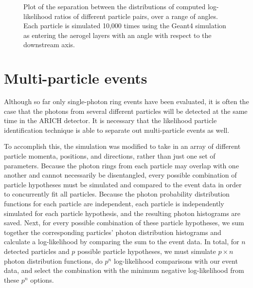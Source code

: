 \begin{figure}[]
\centering
{}
\caption[Plot of the separation between the distributions of computed log-likelihood ratios of different particle pairs, over a range of angles. ]{Plot of the separation between the distributions of computed log-likelihood ratios of different particle pairs, over a range of angles. Each particle is simulated 10,000 times using the Geant4 simulation as entering the aerogel layers with an angle with respect to the downstream axis. }\label{fig:angleSeps}
\end{figure}


\section{Multi-particle events}
\label{sec:multiparticle}
Although so far only single-photon ring events have been evaluated, it is often the case that the photons from several different particles will be detected at the same time in the ARICH detector. 
It is necessary that the likelihood particle identification technique is able to separate out multi-particle events as well. 

To accomplish this, the simulation was modified to take in an array of different particle momenta, positions, and directions, rather than just one set of parameters.
Because the photon rings from each particle may overlap with one another and cannot necessarily be disentangled, every possible combination of particle hypotheses must be simulated and compared to the event data in order to concurrently fit all particles.
Because the photon probability distribution functions for each particle are independent, each particle is independently simulated for each particle hypothesis, and the resulting photon histograms are saved.
Next, for every possible combination of these particle hypotheses, we sum together the corresponding particles' photon distribution histograms and calculate a log-likelihood by comparing the sum to the event data.
In total, for $n$ detected particles and $p$ possible particle hypotheses, we must simulate $p \times n$ photon distribution functions, do $p^n$  log-likelihood comparisons with our event data, and select the combination with the minimum negative log-likelihood from these $p^n$ options. 

